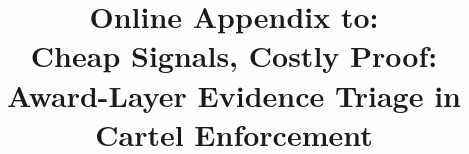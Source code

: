 \documentclass[12pt,authoryear]{elsarticle}
\begin{document}
\sloppy
\hfuzz=300pt

\begin{frontmatter}

\title{Online Appendix to:\\
Cheap Signals, Costly Proof:\\
Award-Layer Evidence Triage in Cartel Enforcement}

\author{}

\end{frontmatter}

\appendix

\setcounter{table}{0}
\setcounter{figure}{0}
\renewcommand{\thetable}{\Alph{section}.\arabic{table}}
\renewcommand{\thefigure}{\Alph{section}.\arabic{figure}}
\makeatletter
{}
\makeatother








\end{document}
